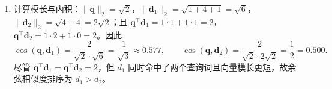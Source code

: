 \begin{exercise}[title={Jaccard 相似度与 TF-IDF 余弦检索手算},level=standard,points=15,tags={Jaccard,TF-IDF,余弦相似度}]
\begin{solution}
\begin{enumerate}
\[    \mathrm{idf}(t)=\log_2\frac{4}{1}=2\quad (t\notin\{\text{data},\text{math}\}).
  \]
  乘以各自词频可得 TF-IDF 向量：
  \[
    \mathbf{d}_1 = (1, 2, 1, 0, 0, 0, 0)^\top,\quad
    \mathbf{d}_2 = (2, 0, 0, 2, 0, 0, 0)^\top,\quad
    \mathbf{q} = (1, 0, 1, 0, 0, 0, 0)^\top.
  \]
  \item 计算模长与内积：$\|\mathbf{q}\|_2=\sqrt{2}$，$\|\mathbf{d}_1\|_2=\sqrt{1+4+1}=\sqrt{6}$，$\|\mathbf{d}_2\|_2=\sqrt{4+4}=2\sqrt{2}$；且 $\mathbf{q}^\top\mathbf{d}_1 = 1\cdot 1 + 1\cdot 1 = 2$，$\mathbf{q}^\top\mathbf{d}_2 = 1\cdot 2 + 1\cdot 0 = 2$。因此
  \[
    \cos(\mathbf{q},\mathbf{d}_1) = \frac{2}{\sqrt{2}\cdot\sqrt{6}} = \frac{1}{\sqrt{3}} \approx 0.577, \qquad
    \cos(\mathbf{q},\mathbf{d}_2) = \frac{2}{\sqrt{2}\cdot 2\sqrt{2}} = \frac{1}{2} = 0.500.
  \]
  尽管 $\mathbf{q}^\top\mathbf{d}_1 = \mathbf{q}^\top\mathbf{d}_2 = 2$，但 $d_1$ 同时命中了两个查询词且向量模长更短，故余弦相似度排序为 $d_1 > d_2$。
\end{enumerate}
\end{solution}
\end{exercise}

